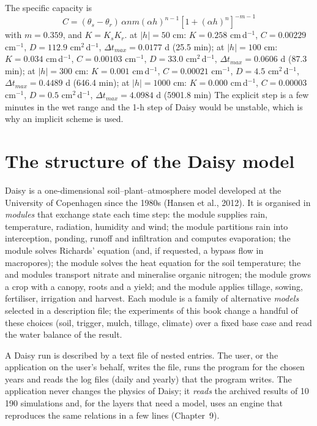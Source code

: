 \sol {}\ans The specific capacity is \[C=(\theta_s-\theta_r)\,\alpha n m(\alpha h)^{n-1}[1+(\alpha h)^n]^{-m-1}\] with $m=0.359$, and $K=K_s K_r$. at $|h|=50$ cm: $K=0.258$ cm\,d$^{-1}$, $C=0.00229$ cm$^{-1}$, $D=112.9$ cm$^2$\,d$^{-1}$, $\Delta t_{max}=0.0177$ d (25.5 min); at $|h|=100$ cm: $K=0.034$ cm\,d$^{-1}$, $C=0.00103$ cm$^{-1}$, $D=33.0$ cm$^2$\,d$^{-1}$, $\Delta t_{max}=0.0606$ d (87.3 min); at $|h|=300$ cm: $K=0.001$ cm\,d$^{-1}$, $C=0.00021$ cm$^{-1}$, $D=4.5$ cm$^2$\,d$^{-1}$, $\Delta t_{max}=0.4489$ d (646.4 min); at $|h|=1000$ cm: $K=0.000$ cm\,d$^{-1}$, $C=0.00003$ cm$^{-1}$, $D=0.5$ cm$^2$\,d$^{-1}$, $\Delta t_{max}=4.0984$ d (5901.8 min) \ans The explicit step is a few minutes in the wet range and the 1-h step of Daisy would be unstable, which is why an implicit scheme is used. \finans

\section{The structure of the Daisy model}
Daisy is a one-dimensional soil--plant--atmosphere model developed at the University of Copenhagen since the 1980s (Hansen et al., 2012). It is organised in \emph{modules} that exchange state each time step: the  module supplies rain, temperature, radiation, humidity and wind; the  module partitions rain into interception, ponding, runoff and infiltration and computes evaporation; the  module solves Richards' equation (and, if requested, a bypass flow in macropores); the  module solves the heat equation for the soil temperature; the  and  modules transport nitrate and mineralise organic nitrogen; the  module grows a crop with a canopy, roots and a yield; and the  module applies tillage, sowing, fertiliser, irrigation and harvest. Each module is a family of alternative \emph{models} selected in a description file; the experiments of this book change a handful of these choices (soil, trigger, mulch, tillage, climate) over a fixed base case and read the water balance of the result.

A Daisy run is described by a text file of nested entries. The user, or the application on the user's behalf, writes the file, runs the program for the chosen years and reads the log files (daily and yearly) that the program writes. The application never changes the physics of Daisy; it \emph{reads} the archived results of 10\,190 simulations and, for the layers that need a model, uses an engine that reproduces the same relations in a few lines (Chapter~9).

